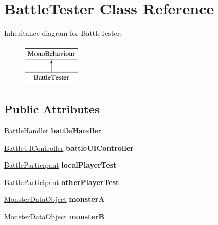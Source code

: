 \hypertarget{class_battle_tester}{\section{Battle\-Tester Class Reference}
\label{class_battle_tester}
}
Inheritance diagram for Battle\-Tester\-:\begin{figure}[H]
\begin{center}
\leavevmode
\includegraphics[height=2.000000cm]{class_battle_tester}
\end{center}
\end{figure}
\subsection*{Public Attributes}
\begin{DoxyCompactItemize}
\item 
\hypertarget{class_battle_tester_a87c03ddd5b47eb2881580fa62588660f}{\hyperlink{class_battle_handler}{Battle\-Handler} {\bfseries battle\-Handler}}\label{class_battle_tester_a87c03ddd5b47eb2881580fa62588660f}

\item 
\hypertarget{class_battle_tester_ab0a3a610e839111f2a5d460c9c140a1f}{\hyperlink{class_battle_u_i_controller}{Battle\-U\-I\-Controller} {\bfseries battle\-U\-I\-Controller}}\label{class_battle_tester_ab0a3a610e839111f2a5d460c9c140a1f}

\item 
\hypertarget{class_battle_tester_ad602b424310978effe2bed83ff7e9571}{\hyperlink{class_battle_participant}{Battle\-Participant} {\bfseries local\-Player\-Test}}\label{class_battle_tester_ad602b424310978effe2bed83ff7e9571}

\item 
\hypertarget{class_battle_tester_a9667e7e35242d772a7089a27027da3c0}{\hyperlink{class_battle_participant}{Battle\-Participant} {\bfseries other\-Player\-Test}}\label{class_battle_tester_a9667e7e35242d772a7089a27027da3c0}

\item 
\hypertarget{class_battle_tester_addc9371e367be0ad46f15d4e4556d632}{\hyperlink{class_monster_data_object}{Monster\-Data\-Object} {\bfseries monster\-A}}\label{class_battle_tester_addc9371e367be0ad46f15d4e4556d632}

\item 
\hypertarget{class_battle_tester_a558e144bf03fac9c26f3d4f4aaaf7c85}{\hyperlink{class_monster_data_object}{Monster\-Data\-Object} {\bfseries monster\-B}}\label{class_battle_tester_a558e144bf03fac9c26f3d4f4aaaf7c85}

\end{DoxyCompactItemize}

